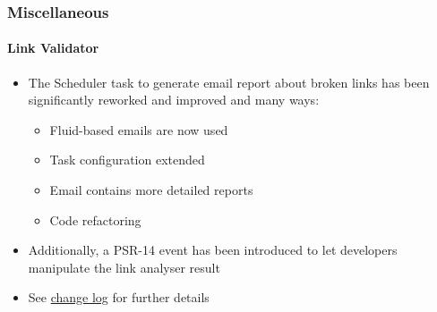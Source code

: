 %

\begin{frame}[fragile]
	\frametitle{Miscellaneous}
	\framesubtitle{Link Validator}


	\begin{itemize}
		\item The Scheduler task to generate email report about broken links
			has been significantly reworked and improved and many ways:

			\begin{itemize}
				\item Fluid-based emails are now used
				\item Task configuration extended
				\item Email contains more detailed reports
				\item Code refactoring
			\end{itemize}

		\item Additionally, a PSR-14 event has been introduced to let developers
			manipulate the link analyser result

		\item See \href{https://docs.typo3.org/c/typo3/cms-core/master/en-us/Changelog/11.0/Feature-29342-ImproveValidatorTask.html}{change log} for further details

	\end{itemize}

\end{frame}

